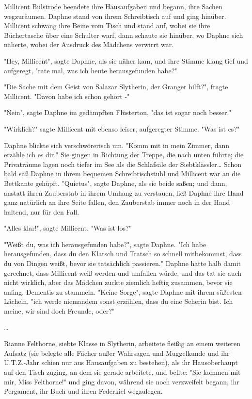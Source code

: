 {Millicent Bulstrode beendete ihre Hausaufgaben und begann, ihre Sachen wegzuräumen. Daphne stand von ihrem Schreibtisch auf und ging hinüber. Millicent schwang ihre Beine vom Tisch und stand auf, wobei sie ihre Büchertasche über eine Schulter warf, dann schaute sie hinüber, wo Daphne sich näherte, wobei der Ausdruck des Mädchens verwirrt war.

"Hey, Millicent", sagte Daphne, als sie näher kam, und ihre Stimme klang tief und aufgeregt, "rate mal, was ich heute herausgefunden habe?"

"Die Sache mit dem Geist von Salazar Slytherin, der Granger hilft?", fragte Millicent. "Davon habe ich schon gehört -"

"Nein", sagte Daphne im gedämpften Flüsterton, "das ist sogar noch besser."

"Wirklich?" sagte Millicent mit ebenso leiser, aufgeregter Stimme. "Was ist es?"

Daphne blickte sich verschwörerisch um. "Komm mit in mein Zimmer, dann erzähle ich es dir." Sie gingen in Richtung der Treppe, die nach unten führte; die Privaträume lagen noch tiefer im See als die Schlafsäle der Siebtklässler… Schon bald saß Daphne in ihrem bequemen Schreibtischstuhl und Millicent war an die Bettkante gehüpft. "Quietus", sagte Daphne, als sie beide saßen; und dann, anstatt ihren Zauberstab in ihrem Umhang zu verstauen, ließ Daphne ihre Hand ganz natürlich an ihre Seite fallen, den Zauberstab immer noch in der Hand haltend, nur für den Fall.

"Alles klar!", sagte Millicent. "Was ist los?"

"Weißt du, was ich herausgefunden habe?", sagte Daphne. "Ich habe herausgefunden, dass du den Klatsch und Tratsch so schnell mitbekommst, dass du von Dingen weißt, bevor sie tatsächlich passieren." Daphne hatte halb damit gerechnet, dass Millicent weiß werden und umfallen würde, und das tat sie auch nicht wirklich, aber das Mädchen zuckte ziemlich heftig zusammen, bevor sie anfing, Dementis zu stammeln. "Keine Sorge", sagte Daphne mit ihrem süßesten Lächeln, "ich werde niemandem sonst erzählen, dass du eine Seherin bist. Ich meine, wir sind doch Freunde, oder?"

…

Rianne Felthorne, siebte Klasse in Slytherin, arbeitete fleißig an einem weiteren Aufsatz (sie belegte alle Fächer außer Wahrsagen und Muggelkunde und ihr U.T.Z.-Jahr schien nur aus Hausaufgaben zu bestehen), als ihr Hausoberhaupt auf den Tisch zuging, an dem sie gerade arbeitete, und bellte: "Sie kommen mit mir, Miss Felthorne!" und ging davon, während sie noch verzweifelt begann, ihr Pergament, ihr Buch und ihren Federkiel wegzulegen.

}
